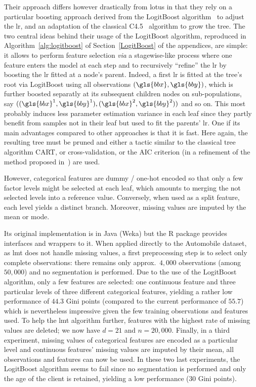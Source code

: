 Their approach differs however drastically from \gls{lotus} in that they rely on a particular boosting approach derived from the LogitBoost algorithm~\cite{friedman2000additive} to adjust the \gls{lr}, and an adaptation of the classical C4.5~\cite{quinlan2014c4} algorithm to grow the tree. The two central ideas behind their usage of the LogitBoost algorithm, reproduced in Algorithm~\ref{alg:logitboost} of Section~\ref{LogitBoost} of the appendices, are simple: it allows to perform feature selection \textit{via} a stagewise-like process where one feature enters the model at each step and to recursively ``refine'' the \gls{lr} by boosting the \gls{lr} fitted at a node's parent. Indeed, a first \gls{lr} is fitted at the tree's root via LogitBoost using all observations $(\gls{bbx},\gls{bby})$, which is further boosted separatly at its subsequent children nodes on sub-populations, say $((\gls{bbx}^1,\gls{bby}^1), (\gls{bbx}^2,\gls{bby}^2))$ and so on. This most probably induces less parameter estimation variance in each leaf since they partly benefit from samples not in their leaf but used to fit the parents' \gls{lr}. One if its main advantages compared to other approaches is that it is fast. Here again, the resulting tree must be pruned and either a tactic similar to the classical tree algorithm CART, or cross-validation, or the AIC criterion (in a refinement of the method proposed in~\cite{sumner2005speeding}) are used.

However, categorical features are dummy / one-hot encoded so that only a few factor levels might be selected at each leaf, which amounts to merging the not selected levels into a reference value. Conversely, when used as a split feature, each level yields a distinct branch. Moreover, missing values are imputed by the mean or mode.

Its original implementation is in Java (Weka) but the \textsf{R} package  provides interfaces and wrappers to it. When applied directly to the Automobile dataset, as \gls{lmt} does not handle missing values, a first preprocessing step is to select only complete observations: there remains only approx.\ $4{,}000$ observations (among $50{,}000$) and no segmentation is performed. Due to the use of the LogitBoost algorithm, only a few features are selected: one continuous feature and three particular levels of three different categorical features, yielding a rather low performance of $44.3$ Gini points (compared to the current performance of $55.7$) which is nevertheless impressive given the few training observations and features used. To help the \gls{lmt} algorithm further, features with the highest rate of missing values are deleted; we now have $d = 21$ and $n = 20{,}000$. Finally, in a third experiment, missing values of categorical features are encoded as a particular level and continuous features' missing values are imputed by their mean, all observations and features can now be used. In these two last experiments, the LogitBoost algorithm seems to fail since no segmentation is performed and only the age of the client is retained, yielding a low performance ($30$ Gini points).

